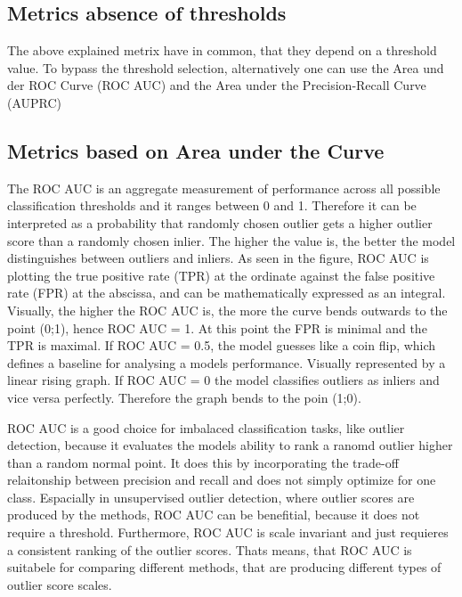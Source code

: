 \subsection*{Metrics absence of thresholds}
The above explained metrix have in common, that they depend on a threshold value.
To bypass the threshold selection, alternatively one can use the Area und der ROC Curve (ROC AUC) and the Area under the Precision-Recall Curve (AUPRC)


\subsection*{Metrics based on Area under the Curve}
The ROC AUC is an aggregate measurement of performance across all possible classification thresholds and it ranges between 0 and 1.
Therefore it can be interpreted as a probability that randomly chosen outlier gets a higher outlier score than a randomly chosen inlier.
The higher the value is, the better the model distinguishes between outliers and inliers.
As seen in the figure, ROC AUC is plotting the true positive rate (TPR) at the ordinate against the false positive rate (FPR) at the abscissa, and can be mathematically expressed as an integral. 
Visually, the higher the ROC AUC is, the more the curve bends outwards to the point (0;1), hence ROC AUC = 1.
At this point the FPR is minimal and the TPR is maximal.
If ROC AUC = 0.5, the model guesses like a coin flip, which defines a baseline for analysing a models performance.
Visually represented by a linear rising graph.
If  ROC AUC = 0 the model classifies outliers as inliers and vice versa perfectly.
Therefore the graph bends to the poin (1;0). 


ROC AUC is a good choice for imbalaced classification tasks, like outlier detection, because it evaluates the models ability to rank a ranomd outlier higher than a random normal point.
It does this by incorporating the trade-off relaitonship between precision and recall and does not simply optimize for one class.
Espacially in unsupervised outlier detection, where outlier scores are produced by the methods, ROC AUC can be benefitial, because it does not require a threshold.
Furthermore, ROC AUC is scale invariant and just requieres a consistent ranking of the outlier scores. 
Thats means, that ROC AUC is suitabele for comparing different methods, that are producing different types of outlier score scales. 


